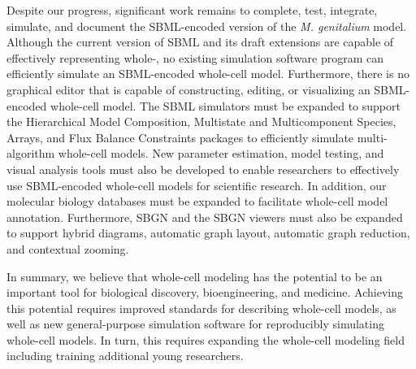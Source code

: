\documentclass[journal,transmag]{IEEEtran}
\begin{document}
Despite our progress, significant work remains to complete, test, integrate, simulate, and document the SBML-encoded version of the \textit{M. genitalium} model. Although the current version of SBML and its draft extensions are capable of effectively representing whole-, no existing simulation software program can efficiently simulate an SBML-encoded whole-cell model. Furthermore, there is no graphical editor that is capable of constructing, editing, or visualizing an SBML-encoded whole-cell model. The SBML simulators must be expanded to support the Hierarchical Model Composition, Multistate and Multicomponent Species, Arrays, and Flux Balance Constraints packages to efficiently simulate multi-algorithm whole-cell models. New parameter estimation, model testing, and visual analysis tools must also be developed to enable researchers to effectively use SBML-encoded whole-cell models for scientific research. In addition, our molecular biology databases must be expanded to facilitate whole-cell model annotation. Furthermore, SBGN and the SBGN viewers must also be expanded to support hybrid diagrams, automatic graph layout, automatic graph reduction, and contextual zooming.

In summary, we believe that whole-cell modeling has the potential to be an important tool for biological discovery, bioengineering, and medicine. Achieving this potential requires improved standards for describing whole-cell models, as well as new general-purpose simulation software for reproducibly simulating whole-cell models. In turn, this requires expanding the whole-cell modeling field including training additional young researchers.

\ifCLASSOPTIONcaptionsoff
  \newpage
\fi




% 
\end{document}
